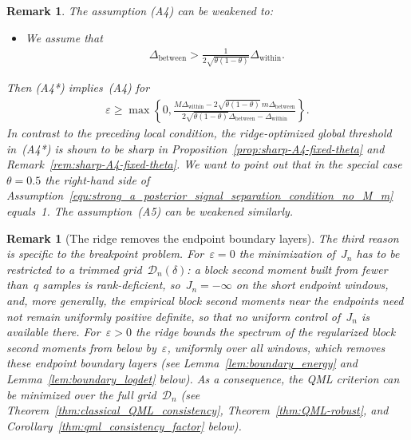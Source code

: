 \documentclass[10pt, letterpaper]{amsart}
\newtheorem{remark}[theorem]{Remark}
\begin{document}
\begin{remark}
 
 The assumption (A4) can be weakened to:
\begin{itemize}
    \item[(A4*)]\label{ass:weak_signal_to_noise_optimized_epsilon} We assume that   
\begin{align}\tag{(A4*)}\label{equ:strong_a_posterior_signal_separation_condition_no_M_m}
  \Delta_{\text{between}}  >   
  \frac{1}{2 \sqrt{\theta (1- \theta)}} \Delta_{\text{within}}.
\end{align}
\end{itemize}
Then (A4*) implies~(A4) for
\begin{align}
    \varepsilon\geq \max \left\{0, \frac{ M \Delta_{\text{within}}- 2 \sqrt{\theta (1- \theta)}\, m\Delta_{\text{between}}}{2 \sqrt{\theta (1- \theta) }\Delta_{\text{between}}-\Delta_{\text{within}}} \right\}.
\end{align}
In contrast to the preceding local condition, the
ridge-optimized global threshold in~\textup{(A4*)} is shown to be sharp in
Proposition~\ref{prop:sharp-A4-fixed-theta} and
Remark~\ref{rem:sharp-A4-fixed-theta}.
We want to point out that in the special case~$\theta = 0.5$ the right-hand side of Assumption~\ref{equ:strong_a_posterior_signal_separation_condition_no_M_m} equals~1. The assumption~(A5) can be weakened similarly.
\end{remark}

\begin{remark}[The ridge removes the endpoint boundary layers]\label{rem:untrimmed_minimization}
The third reason is specific to the breakpoint problem. For~$\varepsilon=0$ the minimization of~$J_n$ has to be restricted to a trimmed grid~$\mathcal D_n(\delta)$: a block second moment built from fewer than~$q$ samples is rank-deficient, so~$J_n=-\infty$ on the short endpoint windows, and, more generally, the empirical block second moments near the endpoints need not remain uniformly positive definite, so that no uniform control of~$J_n$ is available there. For~$\varepsilon>0$ the ridge bounds the spectrum of the regularized block second moments from below by~$\varepsilon$, uniformly over all windows, which removes these endpoint boundary layers (see Lemma~\ref{lem:boundary_energy} and Lemma~\ref{lem:boundary_logdet} below). As a consequence, the QML criterion can be minimized over the full grid~$\mathcal D_n$ (see Theorem~\ref{thm:classical_QML_consistency}, Theorem~\ref{thm:QML-robust}, and Corollary~\ref{thm:qml_consistency_factor} below).
\end{remark}
\end{document}

